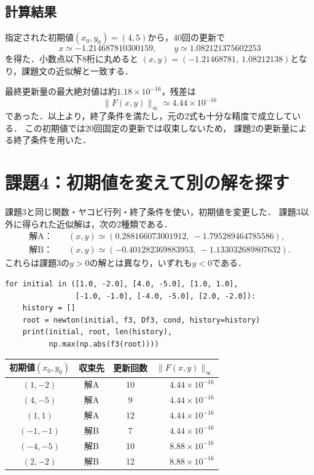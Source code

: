 \documentclass[a4paper,10pt]{article}
\begin{document}
\subsection*{計算結果}
指定された初期値$(x_0,y_0)=(4,5)$から，40回の更新で
\[
 \boxed{x\simeq-1.214687810300159,\qquad
        y\simeq1.082121375602253}
\]
を得た．小数点以下8桁に丸めると
$(x,y)=(-1.21468781,\ 1.08212138)$となり，課題文の近似解と一致する．

最終更新量の最大絶対値は約$1.18\times10^{-16}$，残差は
\[
 \|F(x,y)\|_\infty\simeq4.44\times10^{-16}
\]
であった．以上より，終了条件を満たし，元の2式も十分な精度で成立している．
この初期値では20回固定の更新では収束しないため，
課題2の更新量による終了条件を用いた．

\newpage
\section*{課題4：初期値を変えて別の解を探す}
課題3と同じ関数・ヤコビ行列・終了条件を使い，初期値を変更した．
課題3以外に得られた近似解は，次の2種類である．
\begin{align*}
 \text{解A：}\quad &(x,y)\simeq
 (0.288166073001912,\ -1.795289464785586),\\
 \text{解B：}\quad &(x,y)\simeq
 (-0.401282369883953,\ -1.133032689807632).
\end{align*}
これらは課題3の$y>0$の解とは異なり，いずれも$y<0$である．

\begin{lstlisting}
for initial in ([1.0, -2.0], [4.0, -5.0], [1.0, 1.0],
                [-1.0, -1.0], [-4.0, -5.0], [2.0, -2.0]):
    history = []
    root = newton(initial, f3, Df3, cond, history=history)
    print(initial, root, len(history),
          np.max(np.abs(f3(root))))
\end{lstlisting}

\begin{center}
\begin{tabular}{cccr}
\toprule
初期値$(x_0,y_0)$ & 収束先 & 更新回数 & $\|F(x,y)\|_\infty$\\
\midrule
$(1,-2)$  & 解A & 10 & $4.44\times10^{-16}$\\
$(4,-5)$  & 解A &  9 & $4.44\times10^{-16}$\\
$(1,1)$   & 解A & 12 & $4.44\times10^{-16}$\\
$(-1,-1)$ & 解B &  7 & $4.44\times10^{-16}$\\
$(-4,-5)$ & 解B & 10 & $8.88\times10^{-16}$\\
$(2,-2)$  & 解B & 12 & $8.88\times10^{-16}$\\
\bottomrule
\end{tabular}
\end{center}
\end{document}
